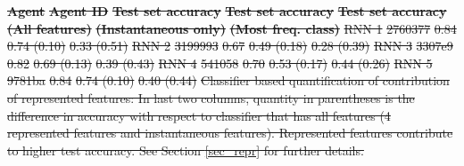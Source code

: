 \documentclass[5p,twocolumn,authoryear]{elsarticle}
\providecommand{\DIFdeltex}[1]{{\protect\color{red}\sout{#1}}}                      %
\providecommand{\DIFdelbegin}{} %
\providecommand{\DIFdelFL}[1]{\DIFdel{#1}} %
\providecommand{\DIFdel}[1]{\texorpdfstring{\DIFdeltex{#1}}{}} %
\newcommand{\DIFscaledelfig}{0.5}
\newlength{\DIFdelgraphicswidth} %
\newlength{\DIFdelgraphicsheight} %
\newcommand{\DIFdelincludegraphics}[2][]{%
\sbox{\DIFdelgraphicsbox}{\DIFOincludegraphics[#1]{#2}}%
\settoboxwidth{\DIFdelgraphicswidth}{\DIFdelgraphicsbox} %
\settoboxtotalheight{\DIFdelgraphicsheight}{\DIFdelgraphicsbox} %
\scalebox{\DIFscaledelfig}{%
\parbox[b]{\DIFdelgraphicswidth}{\usebox{\DIFdelgraphicsbox}\\[-\baselineskip] \rule{\DIFdelgraphicswidth}{0em}}\llap{\resizebox{\DIFdelgraphicswidth}{\DIFdelgraphicsheight}{%
\setlength{\unitlength}{\DIFdelgraphicswidth}%
\begin{picture}(1,1)%
\thicklines\linethickness{2pt} %
{\color[rgb]{1,0,0}\put(0,0){\framebox(1,1){}}}%
{\color[rgb]{1,0,0}\put(0,0){\line( 1,1){1}}}%
{\color[rgb]{1,0,0}\put(0,1){\line(1,-1){1}}}%
\end{picture}%
}\hspace*{3pt}}} %
} %
\DeclareRobustCommand{\DIFdelbegin}{\DIFOdelbegin \let\includegraphics\DIFdelincludegraphics} %
\begin{document}
\DIFdelbegin %
\textbf{\DIFdelFL{Agent}} %
\textbf{\DIFdelFL{Agent ID}} %
\textbf{\DIFdelFL{Test set accuracy}} %
\textbf{\DIFdelFL{Test set accuracy}} %
\textbf{\DIFdelFL{Test set accuracy}}   %
\textbf{\DIFdelFL{(All features)}} %
\textbf{\DIFdelFL{(Instantaneous only)}} %
\textbf{\DIFdelFL{(Most freq. class)}}   %
\DIFdelFL{RNN 1 }%
\DIFdelFL{2760377 }%
\DIFdelFL{0.84 }%
\DIFdelFL{0.74 (0.10) }%
\DIFdelFL{0.33 (0.51) }%
\DIFdelFL{RNN 2 }%
\DIFdelFL{3199993 }%
\DIFdelFL{0.67 }%
\DIFdelFL{0.49 (0.18) }%
\DIFdelFL{0.28 (0.39) }%
\DIFdelFL{RNN 3 }%
\DIFdelFL{3307e9 }%
\DIFdelFL{0.82 }%
\DIFdelFL{0.69 (0.13) }%
\DIFdelFL{0.39 (0.43) }%
\DIFdelFL{RNN 4 }%
\DIFdelFL{541058 }%
\DIFdelFL{0.70 }%
\DIFdelFL{0.53 (0.17) }%
\DIFdelFL{0.44 (0.26) }%
\DIFdelFL{RNN 5 }%
\DIFdelFL{9781ba }%
\DIFdelFL{0.84 }%
\DIFdelFL{0.74 (0.10) }%
\DIFdelFL{0.40 (0.44) }%
{%
\DIFdelFL{Classifier based quantification of contribution of represented features: 
    In last two columns, quantity in parentheses is the difference in accuracy with respect to classifier that has all features (4 represented features and instantaneous features). 
    Represented features contribute to higher test accuracy. 
    See Section \ref{sec_repr} for further details.
    }}
\end{document}
